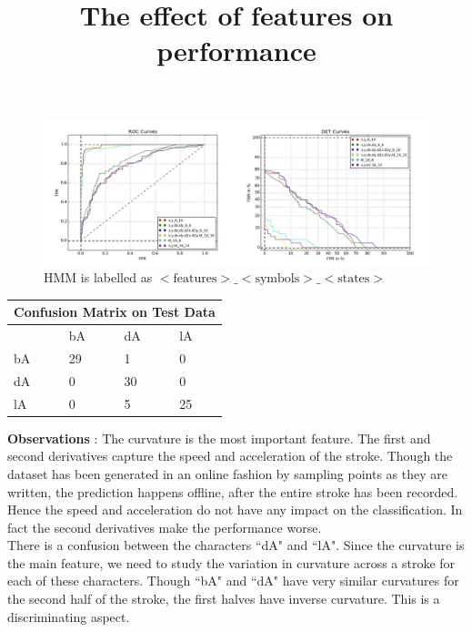 \documentclass{article}
\begin{document}
\begin{figure}[h!]
\centering
\title{The effect of features on performance}
\includegraphics[width=\textwidth]{handwriting/plots/hmm/roc_det_compare.jpg}
\caption{HMM is labelled as $<\text{features}>\_<\text{symbols}>\_<\text{states}>$}
\end{figure}

\begin{table}[h!]
\centering
\begin{tabular}{ |p{1.5cm}|p{1.5cm}|p{1.5cm}|p{1.5cm}|  }
\hline
\multicolumn{4}{|c|}{Confusion Matrix on Test Data} \\
\hline
 & bA & dA & lA \\
\hline
bA & 29 & 1 & 0\\
dA & 0 & 30 & 0\\
lA & 0 & 5 & 25\\
\hline
\end{tabular}
\end{table}

\newpage
\textbf{Observations} : The curvature is the most important feature. The first and second derivatives capture the speed and acceleration of the stroke. Though the dataset has been generated in an online fashion by sampling points as they are written, the prediction happens offline, after the entire stroke has been recorded. Hence the speed and acceleration do not have any impact on the classification. In fact the second derivatives make the performance worse.\\
There is a confusion between the characters ``dA" and ``lA". Since the curvature is the main feature, we need to study the variation in curvature across a stroke for each of these characters. Though ``bA" and ``dA" have very similar curvatures for the second half of the stroke, the first halves have inverse curvature. This is a discriminating aspect.
\end{document}
